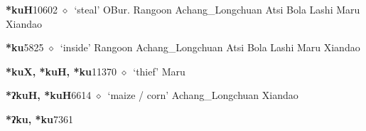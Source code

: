   \begin{list}{}{\leftmargin=1.5em \itemindent=-1.5em}
  \item {\footnotesize \textbf{*kuH}}{\tiny 10602}
         $\diamond$~`steal'
         OBur. 
\hspace{1ex}
         Rangoon 
\hspace{1ex}
         Achang\_Longchuan 
\hspace{1ex}
         Atsi 
\hspace{1ex}
         Bola 
\hspace{1ex}
         Lashi 
\hspace{1ex}
         Maru 
\hspace{1ex}
         Xiandao 
  \item {\footnotesize \textbf{*ku}}{\tiny 5825}
\hspace{1ex}
         $\diamond$~`inside'
         Rangoon 
\hspace{1ex}
         Achang\_Longchuan 
\hspace{1ex}
         Atsi 
\hspace{1ex}
         Bola 
\hspace{1ex}
         Lashi 
\hspace{1ex}
         Maru 
\hspace{1ex}
         Xiandao 
  \item {\footnotesize \textbf{*kuX, *kuH, *ku}}{\tiny 11370}
\hspace{1ex}
         $\diamond$~`thief'
         Maru 
  \item {\footnotesize \textbf{*ʔkuH, *kuH}}{\tiny 6614}
\hspace{1ex}
         $\diamond$~`maize / corn'
         Achang\_Longchuan 
\hspace{1ex}
         Xiandao 
  \item {\footnotesize \textbf{*ʔku, *ku}}{\tiny 7361}
\hspace{1ex}

\end{list}

